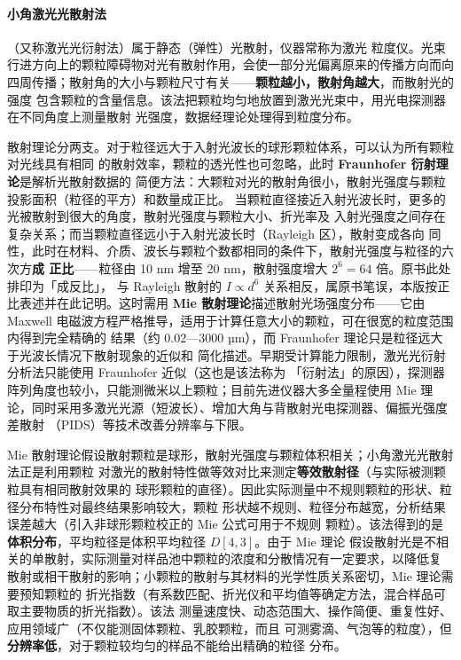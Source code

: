 \paragraph{小角激光光散射法}（又称激光光衍射法）属于静态（弹性）光散射，仪器常称为激光
粒度仪。光束行进方向上的颗粒障碍物对光有散射作用，会使一部分光偏离原来的传播方向而向
四周传播；散射角的大小与颗粒尺寸有关——\textbf{颗粒越小，散射角越大}，而散射光的强度
包含颗粒的含量信息。该法把颗粒均匀地放置到激光光束中，用光电探测器在不同角度上测量散射
光强度，数据经理论处理得到粒度分布。

散射理论分两支。对于粒径远大于入射光波长的球形颗粒体系，可以认为所有颗粒对光线具有相同
的散射效率，颗粒的透光性也可忽略，此时 \textbf{Fraunhofer 衍射理论}是解析光散射数据的
简便方法：大颗粒对光的散射角很小，散射光强度与颗粒投影面积（粒径的平方）和数量成正比。
当颗粒直径接近入射光波长时，更多的光被散射到很大的角度，散射光强度与颗粒大小、折光率及
入射光强度之间存在复杂关系；而当颗粒直径远小于入射光波长时（Rayleigh 区），散射变成各向
同性，此时在材料、介质、波长与颗粒个数都相同的条件下，散射光强度与粒径的六次方\textbf{成
正比}——粒径由 10 nm 增至 20 nm，散射强度增大 $2^{6}=64$ 倍。原书此处排印为「成反比」，
与 Rayleigh 散射的 $I\propto d^{6}$ 关系相反，属原书笔误，本版按正比表述并在此记明。这时需用
\textbf{Mie 散射理论}描述散射光场强度分布——它由
Maxwell 电磁波方程严格推导，适用于计算任意大小的颗粒，可在很宽的粒度范围内得到完全精确的
结果（约 0.02—3000 µm），而 Fraunhofer 理论只是粒径远大于光波长情况下散射现象的近似和
简化描述。早期受计算能力限制，激光光衍射分析法只能使用 Fraunhofer 近似（这也是该法称为
「衍射法」的原因），探测器阵列角度也较小，只能测微米以上颗粒；目前先进仪器大多全量程使用
Mie 理论，同时采用多激光光源（短波长）、增加大角与背散射光电探测器、偏振光强度差散射
（PIDS）等技术改善分辨率与下限。

Mie 散射理论假设散射颗粒是球形，散射光强度与颗粒体积相关；小角激光光散射法正是利用颗粒
对激光的散射特性做等效对比来测定\textbf{等效散射径}（与实际被测颗粒具有相同散射效果的
球形颗粒的直径）。因此实际测量中不规则颗粒的形状、粒径分布特性对最终结果影响较大，颗粒
形状越不规则、粒径分布越宽，分析结果误差越大（引入非球形颗粒校正的 Mie 公式可用于不规则
颗粒）。该法得到的是\textbf{体积分布}，平均粒径是体积平均粒径 $D[4,3]$。由于 Mie 理论
假设散射光是不相关的单散射，实际测量对样品池中颗粒的浓度和分散情况有一定要求，以降低复
散射或相干散射的影响；小颗粒的散射与其材料的光学性质关系密切，Mie 理论需要预知颗粒的
折光指数（有系数匹配、折光仪和平均值等确定方法，混合样品可取主要物质的折光指数）。该法
测量速度快、动态范围大、操作简便、重复性好、应用领域广（不仅能测固体颗粒、乳胶颗粒，而且
可测雾滴、气泡等的粒度），但\textbf{分辨率低}，对于颗粒较均匀的样品不能给出精确的粒径
分布。

